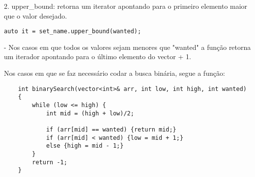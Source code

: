 2. upper\_bound: retorna um iterator apontando para o primeiro elemento maior que o valor desejado.
\begin{verbatim}
auto it = set_name.upper_bound(wanted);
\end{verbatim}
- Nos casos em que todos os valores sejam menores que "wanted" a função retorna um iterador apontando para o último elemento do vector + 1.

Nos casos em que se faz necessário codar a busca binária, segue a função:
\begin{verbatim}
    int binarySearch(vector<int>& arr, int low, int high, int wanted) 
    { 
        while (low <= high) { 
            int mid = (high + low)/2; 

            if (arr[mid] == wanted) {return mid;} 
            if (arr[mid] < wanted) {low = mid + 1;}  
            else {high = mid - 1;} 
        } 
        return -1; 
    } 
\end{verbatim}


